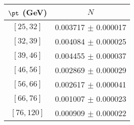 \begin{tabular}{c||c}
$\pt$ (GeV) & $N$  \\
\hline
$[25, 32]$ & 0.003717 $\pm$ 0.000017\\
$[32, 39]$ & 0.004084 $\pm$ 0.000025\\
$[39, 46]$ & 0.004455 $\pm$ 0.000037\\
$[46, 56]$ & 0.002869 $\pm$ 0.000029\\
$[56, 66]$ & 0.002617 $\pm$ 0.000041\\
$[66, 76]$ & 0.001007 $\pm$ 0.000023\\
$[76, 120]$ & 0.000909 $\pm$ 0.000022\\
\end{tabular}
